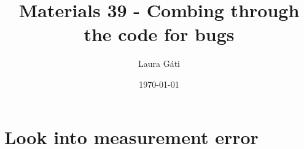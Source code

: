 \documentclass[11pt]{article}
\renewcommand{\[}{\begin{equation}}
\renewcommand{\]}{\end{equation}}
\begin{document}
\linespread{1.0}

\title{Materials 39 - Combing through the code for bugs}
\author{Laura G\'ati} 
\date{\today}
\maketitle


\tableofcontents


\newpage

\section{Look into measurement error}
\end{document}
